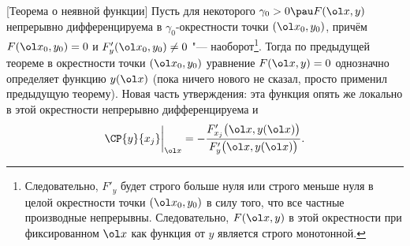 [Теорема о неявной функции]\label{ThoNF}
	Пусть для некоторого $\gamma_0>0\pau F(\ol x,y)$ непрерывно дифференцируема в $\gamma_0$-окрестности точки $(\ol x_0,y_0)$, причём
	$F(\ol x_0,y_0) = 0$ и $F'_y(\ol x_0,y_0)\ne 0$ "--- наоборот\footnote{Следовательно,
	$F'_y$ будет строго больше нуля или строго меньше нуля в целой окрестности точки $(\ol x_0,y_0)$ в силу того, что все частные
	производные непрерывны. Следовательно, $F(\ol x,y)$ в этой окрестности при фиксированном $\ol x$ как функция от $y$ является строго монотонной.}.
	Тогда по предыдущей теореме в окрестности точки $(\ol x_0,y_0)$ уравнение $F(\ol x,y) = 0$ однозначно определяет функцию $y(\ol x)$ (пока ничего нового не сказал,
	просто применил предыдущую теорему). Новая часть утверждения: эта функция опять же локально в этой окрестности непрерывно дифференцируема и 
	\[\CP{y}{x_j}\bigg|_{\ol x} = -\frac{F'_{x_j}\big(\ol x,y(\ol x)\big)}{F'_y\big(\ol x,y(\ol x)\big)}.\]
	